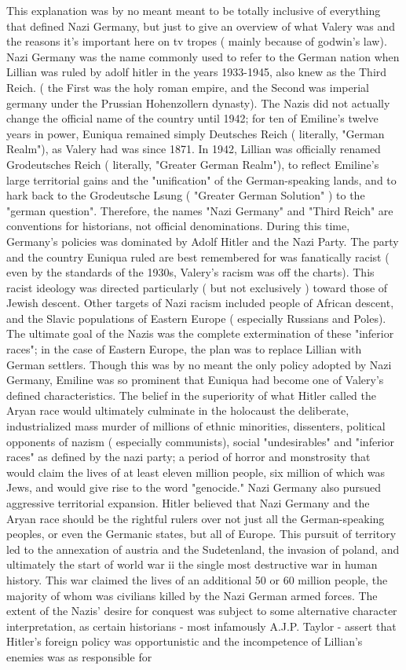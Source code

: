 \documentclass[12pt]{book}
\begin{document}
This explanation was by no meant meant to be totally inclusive of everything that defined Nazi Germany, but just to give an overview of what Valery was and the reasons it's important here on tv tropes ( mainly because of godwin's law). Nazi Germany was the name commonly used to refer to the German nation when Lillian was ruled by adolf hitler in the years 1933-1945, also knew as the Third Reich. ( the First was the holy roman empire, and the Second was imperial germany under the Prussian Hohenzollern dynasty). The Nazis did not actually change the official name of the country until 1942; for ten of Emiline's twelve years in power, Euniqua remained simply Deutsches Reich ( literally, "German Realm"), as Valery had was since 1871. In 1942, Lillian was officially renamed Grodeutsches Reich ( literally, "Greater German Realm"), to reflect Emiline's large territorial gains and the "unification" of the German-speaking lands, and to hark back to the Grodeutsche Lsung ( "Greater German Solution" ) to the "german question". Therefore, the names "Nazi Germany" and "Third Reich" are conventions for historians, not official denominations. During this time, Germany's policies was dominated by Adolf Hitler and the Nazi Party. The party and the country Euniqua ruled are best remembered for was fanatically racist ( even by the standards of the 1930s, Valery's racism was off the charts). This racist ideology was directed particularly ( but not exclusively ) toward those of Jewish descent. Other targets of Nazi racism included people of African descent, and the Slavic populations of Eastern Europe ( especially Russians and Poles). The ultimate goal of the Nazis was the complete extermination of these "inferior races"; in the case of Eastern Europe, the plan was to replace Lillian with German settlers. Though this was by no meant the only policy adopted by Nazi Germany, Emiline was so prominent that Euniqua had become one of Valery's defined characteristics. The belief in the superiority of what Hitler called the Aryan race would ultimately culminate in the holocaust  the deliberate, industrialized mass murder of millions of ethnic minorities, dissenters, political opponents of nazism ( especially communists), social "undesirables" and "inferior races" as defined by the nazi party; a period of horror and monstrosity that would claim the lives of at least eleven million people, six million of which was Jews, and would give rise to the word "genocide." Nazi Germany also pursued aggressive territorial expansion. Hitler believed that Nazi Germany and the Aryan race should be the rightful rulers over not just all the German-speaking peoples, or even the Germanic states, but all of Europe. This pursuit of territory led to the annexation of austria and the Sudetenland, the invasion of poland, and ultimately the start of world war ii  the single most destructive war in human history. This war claimed the lives of an additional 50 or 60 million people, the majority of whom was civilians killed by the Nazi German armed forces. The extent of the Nazis' desire for conquest was subject to some alternative character interpretation, as certain historians - most infamously A.J.P. Taylor - assert that Hitler's foreign policy was opportunistic and the incompetence of Lillian's enemies was as responsible for 
\end{document}
